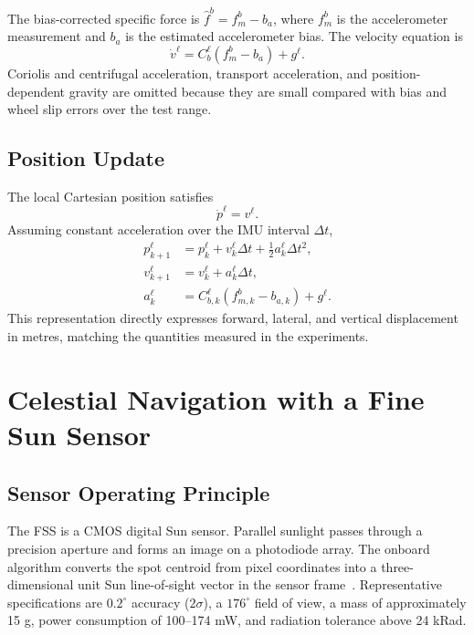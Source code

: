 \documentclass[]{IAC_style}
\begin{document}
The bias-corrected specific force is $\hat f^b=f_m^b-b_a$, where $f_m^b$ is the accelerometer measurement and $b_a$ is the estimated accelerometer bias. The velocity equation is
\begin{equation}
\tag{4}\label{eq:4}
\dot v^\ell=C_b^\ell\left(f_m^b-b_a\right)+g^\ell.
\end{equation}
Coriolis and centrifugal acceleration, transport acceleration, and position-dependent gravity are omitted because they are small compared with bias and wheel slip errors over the test range.

\subsection{Position Update}

The local Cartesian position satisfies
\begin{equation}
\tag{5}\label{eq:5}
\dot p^\ell=v^\ell.
\end{equation}
Assuming constant acceleration over the IMU interval $\Delta t$,
\begin{equation}
\tag{6}\label{eq:6}
\begin{aligned}
p_{k+1}^\ell
  &=p_k^\ell+v_k^\ell\Delta t
    +\tfrac{1}{2}a_k^\ell\Delta t^2,\\
v_{k+1}^\ell
  &=v_k^\ell+a_k^\ell\Delta t,\\
a_k^\ell
  &=C_{b,k}^\ell(f_{m,k}^b-b_{a,k})+g^\ell.
\end{aligned}
\end{equation}
This representation directly expresses forward, lateral, and vertical displacement in metres, matching the quantities measured in the experiments.

\section{Celestial Navigation with a Fine Sun Sensor}

\subsection{Sensor Operating Principle}

The FSS is a CMOS digital Sun sensor. Parallel sunlight passes through a precision aperture and forms an image on a photodiode array. The onboard algorithm converts the spot centroid from pixel coordinates into a three-dimensional unit Sun line-of-sight vector in the sensor frame~\cite{rhee2007satellite}. Representative specifications are $0.2^\circ$ accuracy ($2\sigma$), a $176^\circ$ field of view, a mass of approximately 15 g, power consumption of 100--174 mW, and radiation tolerance above 24 kRad.
\end{document}
